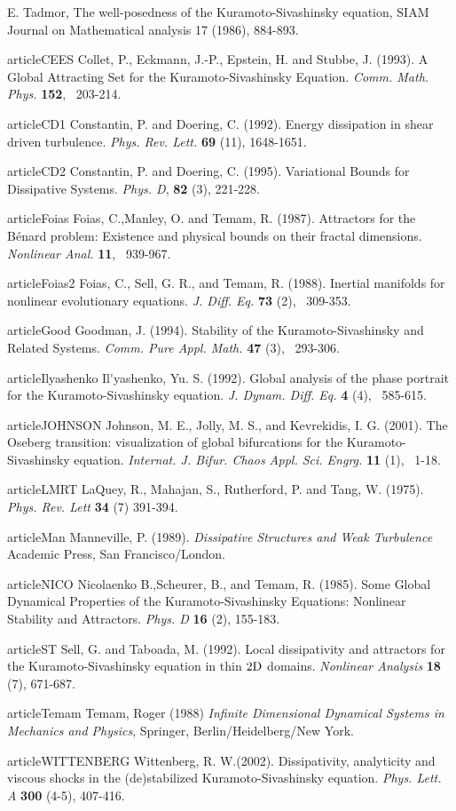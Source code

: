 E. Tadmor, The well-posedness of the Kuramoto-Sivashinsky equation, SIAM Journal on Mathematical analysis 17 (1986), 884-893.


article{CEES}
Collet, P., Eckmann, J.-P., Epstein, H. and Stubbe, J. (1993).
A Global Attracting Set for the Kuramoto-Sivashinsky Equation.
{\it Comm. Math. Phys.}
{\bf 152}, ~203-214.

article{CD1} Constantin, P. and Doering, C. (1992).
Energy dissipation in shear driven turbulence.
{\it Phys. Rev. Lett.} {\bf 69} (11), 1648-1651.

article{CD2} Constantin, P. and Doering, C. (1995).
Variational Bounds for Dissipative Systems.
{\it Phys. D}, {\bf 82} (3), 221-228.

article{Foias}
Foias, C.,Manley, O. and Temam, R. (1987).
Attractors for the B\'{e}nard problem:
Existence and physical bounds on their fractal dimensions.
{\it Nonlinear Anal.}
{\bf 11}, ~939-967.

article{Foias2}
Foias, C., Sell, G. R., and  Temam, R. (1988).
Inertial manifolds for nonlinear evolutionary equations.
{\it J. Diff. Eq.}
{\bf 73} (2), ~309-353.

article{Good}
Goodman, J. (1994).
Stability of the Kuramoto-Sivashinsky and Related Systems.
{\it Comm. Pure Appl. Math.}
{\bf 47} (3), ~293-306.

article{Ilyashenko}
Il\'{}yashenko, Yu. S. (1992).
Global analysis of the phase portrait for the Kuramoto-Sivashinsky equation.
{\it J. Dynam. Diff. Eq.}
{\bf 4}  (4), ~585-615.

article{JOHNSON}
 Johnson, M. E., Jolly, M. S., and  Kevrekidis, I. G. (2001).
The Oseberg transition: visualization of global bifurcations for the
Kuramoto-Sivashinsky equation.
{\it Internat. J. Bifur. Chaos Appl. Sci. Engrg.}
{\bf 11} (1), ~1-18.

article{LMRT} LaQuey, R., Mahajan, S., Rutherford, P. and Tang, W. (1975).
{\it Phys. Rev. Lett} {\bf 34} (7) 391-394.


article{Man} Manneville, P. (1989).
{\it Dissipative Structures and Weak Turbulence} Academic Press, San Francisco/London.

article{NICO}
Nicolaenko B.,Scheurer, B., and Temam, R. (1985).
Some Global Dynamical Properties of the Kuramoto-Sivashinsky Equations: Nonlinear Stability and Attractors.
{\it Phys. D}
{\bf 16} (2), 155-183.

article{ST} Sell, G. and Taboada, M. (1992).
 Local dissipativity and attractors for the Kuramoto-Sivashinsky
equation in thin $2{\rm D}$ domains.
{\it Nonlinear Analysis} {\bf 18} (7), 671-687.

article{Temam}
Temam, Roger (1988)
{\itshape Infinite Dimensional Dynamical Systems in Mechanics and Physics},
Springer, Berlin/Heidelberg/New York.

article{WITTENBERG}
Wittenberg, R. W.(2002).
Dissipativity, analyticity and viscous shocks in the (de)stabilized
Kuramoto-Sivashinsky equation.
{\it Phys. Lett. A}
{\bf 300} (4-5), 407-416.
